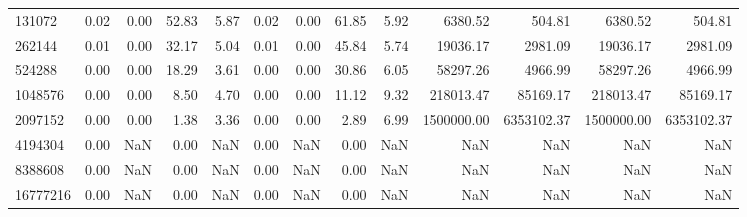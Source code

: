 \begin{tabular}{lrrrrrrrrrrrr}
131072 & 0.02 & 0.00 & 52.83 & 5.87 & 0.02 & 0.00 & 61.85 & 5.92 & 6380.52 & 504.81 & 6380.52 & 504.81 \\
262144 & 0.01 & 0.00 & 32.17 & 5.04 & 0.01 & 0.00 & 45.84 & 5.74 & 19036.17 & 2981.09 & 19036.17 & 2981.09 \\
524288 & 0.00 & 0.00 & 18.29 & 3.61 & 0.00 & 0.00 & 30.86 & 6.05 & 58297.26 & 4966.99 & 58297.26 & 4966.99 \\
1048576 & 0.00 & 0.00 & 8.50 & 4.70 & 0.00 & 0.00 & 11.12 & 9.32 & 218013.47 & 85169.17 & 218013.47 & 85169.17 \\
2097152 & 0.00 & 0.00 & 1.38 & 3.36 & 0.00 & 0.00 & 2.89 & 6.99 & 1500000.00 & 6353102.37 & 1500000.00 & 6353102.37 \\
4194304 & 0.00 & NaN & 0.00 & NaN & 0.00 & NaN & 0.00 & NaN & NaN & NaN & NaN & NaN \\
8388608 & 0.00 & NaN & 0.00 & NaN & 0.00 & NaN & 0.00 & NaN & NaN & NaN & NaN & NaN \\
16777216 & 0.00 & NaN & 0.00 & NaN & 0.00 & NaN & 0.00 & NaN & NaN & NaN & NaN & NaN \\
\bottomrule
\end{tabular}
